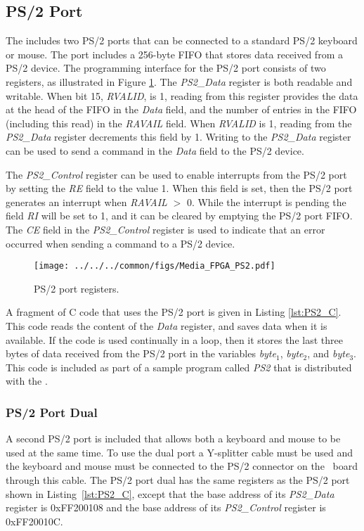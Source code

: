 \subsection{PS/2 Port}

The {\it \systemNameFull} includes two PS/2 ports that can be connected to a standard PS/2
keyboard or mouse. The port includes a 256-byte FIFO that stores data received from a PS/2
device.  The programming interface for the PS/2 port consists of two registers, 
as illustrated in Figure \ref{fig:PS2_port}. The {\it PS2\_Data} register is both readable
and writable. When bit 15, {\it RVALID}, is 1, reading from this register provides the data 
at the head of the FIFO in the
{\it Data} field, and the number of entries in the FIFO (including this read) in the 
{\it RAVAIL} field. When {\it RVALID} is 1, reading from the {\it PS2\_Data} register
decrements this field by 1. Writing to the {\it PS2\_Data} register can be used to send a
command in the {\it Data} field to the PS/2 device.

The {\it PS2\_Control} register can be used to enable interrupts from the PS/2 port by
setting the {\it RE} field to the value 1. When this field is set, then the PS/2 port
generates an interrupt when {\it RAVAIL} $>$ 0. While the interrupt is pending the
field {\it RI} will be set to 1, and it can be cleared by emptying the PS/2 port FIFO. The
{\it CE} field in the {\it PS2\_Control} register is used to indicate that an error
occurred when sending a command to a PS/2 device.

\begin{figure}[h!]
   \begin{center}
       \texttt{[image: ../../../common/figs/Media\_FPGA\_PS2.pdf]}
   \end{center}
   \caption{PS/2 port registers.}
	\label{fig:PS2_port}
\end{figure}

A fragment of C code that uses the PS/2 port is given in Listing \ref{lst:PS2_C}.  
This code reads the content of the {\it Data} register, and saves data when it is
available.  If the code is used continually in a loop, then it
stores the last three bytes of data received from the
PS/2 port in the variables {\it byte}$_1$, {\it byte}$_2$, and {\it byte}$_3$.
This code is included as part of a sample program
called {\it PS2} that is distributed with the \productNameMed{}. 

\subsubsection{PS/2 Port Dual}

A second PS/2 port is included that allows both a keyboard and mouse
to be used at the same time. To use the dual port a Y-splitter cable must be used and the
keyboard and mouse must be connected to the PS/2 connector on the \DEBoard~board through this
cable. The PS/2 port dual has the same registers as the PS/2 port shown in
Listing~\ref{lst:PS2_C}, except that the base address of its {\it PS2\_Data} register 
is {\sf 0xFF200108} and the base address of its {\it PS2\_Control} register is {\sf 0xFF20010C}.

